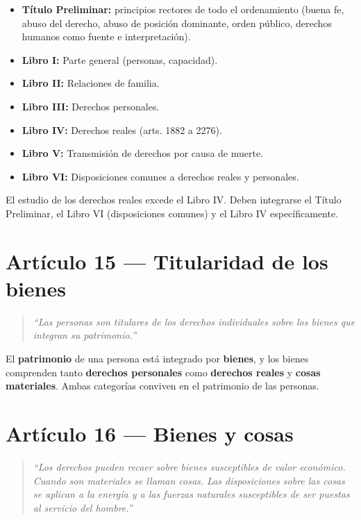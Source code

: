 \documentclass[12pt,oneside]{book}
\begin{document}
\begin{itemize}
    \item \textbf{T\'itulo Preliminar:} principios rectores de todo el ordenamiento (buena fe, abuso del derecho, abuso de posici\'on dominante, orden p\'ublico, derechos humanos como fuente e interpretaci\'on).
    \item \textbf{Libro I:} Parte general (personas, capacidad).
    \item \textbf{Libro II:} Relaciones de familia.
    \item \textbf{Libro III:} Derechos personales.
    \item \textbf{Libro IV:} Derechos reales (arts. 1882 a 2276).
    \item \textbf{Libro V:} Transmisi\'on de derechos por causa de muerte.
    \item \textbf{Libro VI:} Disposiciones comunes a derechos reales y personales.
\end{itemize}

\begin{important}
El estudio de los derechos reales excede el Libro IV. Deben integrarse el T\'itulo Preliminar, el Libro VI (disposiciones comunes) y el Libro IV espec\'ificamente.
\end{important}

\section{Art\'iculo 15 --- Titularidad de los bienes}

\begin{quote}
\textit{``Las personas son titulares de los derechos individuales sobre los bienes que integran su patrimonio.''}
\end{quote}

El \textbf{patrimonio} de una persona est\'a integrado por \textbf{bienes}, y los bienes comprenden tanto \textbf{derechos personales} como \textbf{derechos reales} y \textbf{cosas materiales}. Ambas categor\'ias conviven en el patrimonio de las personas.

\section{Art\'iculo 16 --- Bienes y cosas}

\begin{quote}
\textit{``Los derechos pueden recaer sobre bienes susceptibles de valor econ\'omico. Cuando son materiales se llaman cosas. Las disposiciones sobre las cosas se aplican a la energ\'ia y a las fuerzas naturales susceptibles de ser puestas al servicio del hombre.''}
\end{quote}
\end{document}

